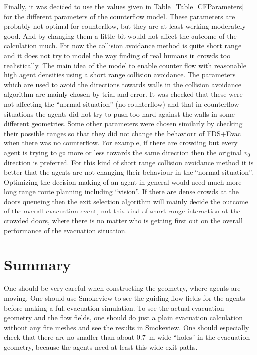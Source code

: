 \documentclass[12pt,a4paper,final,twoside]{stylevk}
\begin{document}
Finally, it was decided to use the values given in
Table~\ref{Table_CFParameters} for the different parameters of the
counterflow model.  These parameters are probably not optimal for
counterflow, but they are at least working moderately good.  And by
changing them a little bit would not affect the outcome of the
calculation much.  For now the collision avoidance method is quite
short range and it does not try to model the way finding of real humans
in crowds too realistically.  The main idea of the model to enable
counter flow with reasonable high agent densities using a short range
collision avoidance.  The parameters which are used to avoid the
directions towards walls in the collision avoidance algorithm are
mainly chosen by trial and error.  It was checked that these were not
affecting the ``normal situation'' (no counterflow) and that in
counterflow situations the agents did not try to push too hard against
the walls in some different geometries.  Some other parameters were
chosen similarly by checking their possible ranges so that they did
not change the behaviour of FDS+Evac when there was no counterflow.
For example, if there are crowding but every agent is trying to go
more or less towards the same direction then the original $v_0$
direction is preferred.  For this kind of short range collision
avoidance method it is better that the agents are not changing their
behaviour in the ``normal situation''.  Optimizing the decision making
of an agent in general would need much more long range route planning
including ``vision''.  If there are dense crowds at the doors queueing
then the exit selection algorithm will mainly decide the outcome of
the overall evacuation event, not this kind of short range interaction
at the crowded doors, where there is no matter who is getting first
out on the overall performance of the evacuation situation.


\section{Summary}

\noindent One should be very careful when constructing the geometry,
where agents are moving.  One should use Smokeview to see the guiding
flow fields for the agents before making a full evacuation simulation.
To see the actual evacuation geometry and the flow fields, one should
do just a plain evacuation calculation without any fire meshes and see
the results in Smokeview.  One should especially check that there are
no smaller than about 0.7~m wide ``holes'' in the evacuation geometry,
because the agents need at least this wide exit paths.
\end{document}
